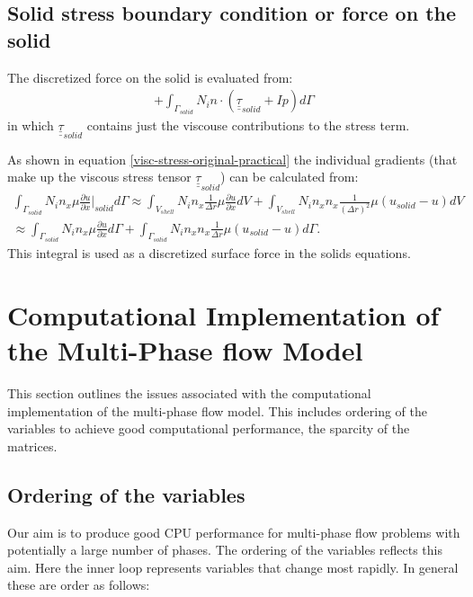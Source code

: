 \subsection{Solid stress boundary condition or force on the solid} 

The discretized force on the solid is evaluated from:
\begin{eqnarray}
+ \int_{\Gamma_{solid}} N_i n\cdot (\underline{\underline{\tau}}_{solid} + I p) d\Gamma
\end{eqnarray} 
in which $\underline{\underline{\tau}}_{solid}$ contains just the viscouse contributions 
to the stress term. 

As shown in equation \ref{visc-stress-original-practical}  the 
individual gradients (that make up the viscous stress tensor  $\underline{\underline{\tau}}_{solid}$) can be calculated from:
\begin{eqnarray}
\int_{\Gamma_{solid}}  N_i n_x \mu \frac{\partial u}{\partial x} \vert_{solid} d\Gamma
\approx 
\int_{V_{shell}}  N_i n_x \frac{1}{\Delta r}\mu \frac{\partial u}{\partial x}  dV
+
\int_{V_{shell}}  N_i n_x n_x \frac{1}{(\Delta r)^2}\mu (u_{solid} -u)  dV \\
\approx 
\int_{\Gamma_{solid}}  N_i n_x \mu \frac{\partial u}{\partial x}  d\Gamma
+
\int_{\Gamma_{solid}}  N_i n_x n_x \frac{1}{\Delta r}\mu (u_{solid} -u)  d\Gamma. 
\label{visc-stress-original-practical-solid-bc} 
\end{eqnarray} 
This integral is used as a discretized surface force in the solids equations. 
 






\pagebreak



\section{Computational Implementation of the Multi-Phase flow Model}
\label{Computational Implementation} 

This section outlines the issues associated with the 
computational implementation of the multi-phase flow model. 
This includes ordering of the variables to achieve good computational 
performance, the sparcity of the matrices. 

\subsection{Ordering of the variables}
\label{Ordering} 
Our aim is to produce good CPU performance for multi-phase flow 
problems with potentially a large number of phases. The ordering of 
the variables reflects this aim. Here the inner loop represents variables that 
change most rapidly. 
In general these are order as follows: 


